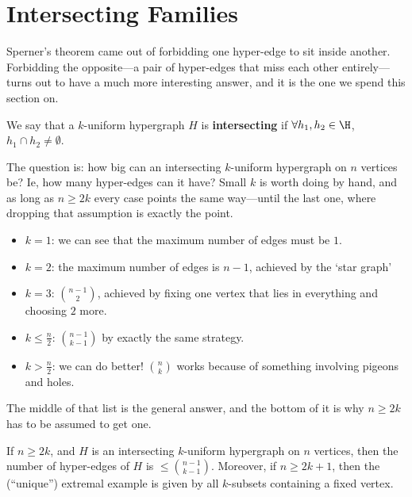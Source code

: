 \section{Intersecting Families}

Sperner's theorem came out of forbidding one hyper-edge to sit inside another. Forbidding the opposite---a pair of hyper-edges that miss each other entirely---turns out to have a much more interesting answer, and it is the one we spend this section on.

\begin{boxdefinition}[Intersecting]
    We say that a $k$-uniform hypergraph $H$ is \textbf{intersecting} if $\forall h_1, h_2 \in \H$, $h_1 \cap h_2 \ne \emptyset$.
\end{boxdefinition}

The question is: how big can an intersecting $k$-uniform hypergraph on $n$ vertices be? Ie, how many hyper-edges can it have? Small $k$ is worth doing by hand, and as long as $n \geq 2k$ every case points the same way---until the last one, where dropping that assumption is exactly the point.

\begin{itemize}
    \item $k = 1$: we can see that the maximum number of edges must be $1$.
    \item $k = 2$: the maximum number of edges is $n - 1$, achieved by the `star graph'
    \begin{center}
    \end{center}
    \item $k = 3$: $\binom{n-1}{2}$, achieved by fixing one vertex that lies in everything and choosing $2$ more.
    \item $k \leq \frac{n}{2}$: $\binom{n-1}{k-1}$ by exactly the same strategy.
    \item $k > \frac{n}{2}$: we can do better! $\binom{n}{k}$ works because of something involving pigeons and holes.
\end{itemize}

The middle of that list is the general answer, and the bottom of it is why $n \geq 2k$ has to be assumed to get one.

\begin{boxtheorem} \label{Ch1:Thm:EKR}
    If $n \geq 2k$, and $H$ is an intersecting $k$-uniform hypergraph on $n$ vertices, then the number of hyper-edges of $H$ is $\leq \binom{n-1}{k-1}$. Moreover, if $n \geq 2k + 1$, then the (``unique'') extremal example is given by all $k$-subsets containing a fixed vertex.
\end{boxtheorem}


